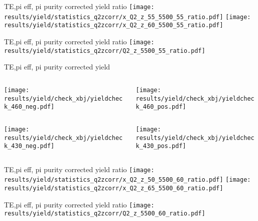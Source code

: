 \begin{frame}{TE,pi eff, pi purity corrected yield ratio}
\texttt{[image: results/yield/statistics\_q2zcorr/x\_Q2\_z\_55\_5500\_55\_ratio.pdf]}
\texttt{[image: results/yield/statistics\_q2zcorr/x\_Q2\_z\_60\_5500\_55\_ratio.pdf]}
\end{frame}
\begin{frame}{TE,pi eff, pi purity corrected yield ratio}
\texttt{[image: results/yield/statistics\_q2zcorr/Q2\_z\_5500\_55\_ratio.pdf]}
\end{frame}
\begin{frame}{TE,pi eff, pi purity corrected yield}
\begin{columns}
\begin{column}[T]{0.5\textwidth}
\texttt{[image: results/yield/check\_xbj/yieldcheck\_460\_neg.pdf]}
\end{column}
\begin{column}[T]{0.5\textwidth}
\texttt{[image: results/yield/check\_xbj/yieldcheck\_460\_pos.pdf]}
\end{column}
\end{columns}
\begin{columns}
\begin{column}[T]{0.5\textwidth}
\texttt{[image: results/yield/check\_xbj/yieldcheck\_430\_neg.pdf]}
\end{column}
\begin{column}[T]{0.5\textwidth}
\texttt{[image: results/yield/check\_xbj/yieldcheck\_430\_pos.pdf]}
\end{column}
\end{columns}
\end{frame}
\begin{frame}{TE,pi eff, pi purity corrected yield ratio}
\texttt{[image: results/yield/statistics\_q2zcorr/x\_Q2\_z\_50\_5500\_60\_ratio.pdf]}
\texttt{[image: results/yield/statistics\_q2zcorr/x\_Q2\_z\_65\_5500\_60\_ratio.pdf]}
\end{frame}
\begin{frame}{TE,pi eff, pi purity corrected yield ratio}
\texttt{[image: results/yield/statistics\_q2zcorr/Q2\_z\_5500\_60\_ratio.pdf]}
\end{frame}
